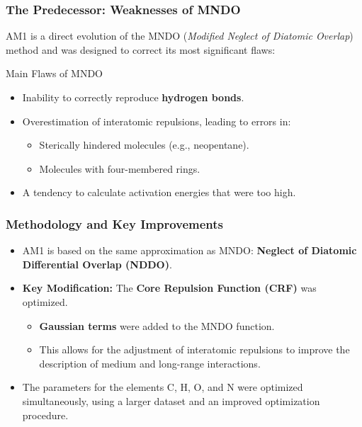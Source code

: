 \begin{frame}
  \frametitle{The Predecessor: Weaknesses of MNDO}
  
  AM1 is a direct evolution of the MNDO (\textit{Modified Neglect of Diatomic Overlap}) method and was designed to correct its most significant flaws: \pause
  
  \begin{block}{Main Flaws of MNDO}
    \begin{itemize}
      \item Inability to correctly reproduce \textbf{hydrogen bonds}. \pause
      \item Overestimation of interatomic repulsions, leading to errors in: \pause
      \begin{itemize}
          \item Sterically hindered molecules (e.g., neopentane). \pause
          \item Molecules with four-membered rings. \pause
      \end{itemize}
      \item A tendency to calculate activation energies that were too high.
    \end{itemize}
  \end{block}
\end{frame}


\begin{frame}
  \frametitle{Methodology and Key Improvements}
  
  \begin{itemize}
    \item AM1 is based on the same approximation as MNDO: \textbf{Neglect of Diatomic Differential Overlap (NDDO)}. \pause
    \item \textbf{Key Modification:} The \textbf{Core Repulsion Function (CRF)} was optimized. \pause
    \begin{itemize}
        \item \textbf{Gaussian terms} were added to the MNDO function. \pause
        \item This allows for the adjustment of interatomic repulsions to improve the description of medium and long-range interactions. \pause
    \end{itemize}
    \item The parameters for the elements C, H, O, and N were optimized simultaneously, using a larger dataset and an improved optimization procedure.
  \end{itemize}
\end{frame}


